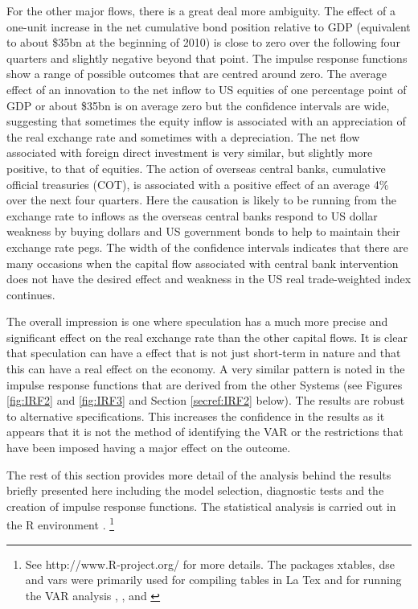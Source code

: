 \documentclass[12pt, a4paper, oneside]{article}\usepackage[]{graphicx}\usepackage[]{color}
\begin{document}
For the other major flows, there is a great deal more ambiguity.  The effect of a one-unit increase in the net cumulative bond position relative to GDP (equivalent to about \$35bn at the beginning of 2010) is close to zero over the following four quarters and slightly negative beyond that point.  The impulse response functions show a range of possible outcomes that are centred around zero.  The average effect of an innovation to the net inflow to US equities of one percentage point of GDP or about \$35bn is on average zero but the confidence intervals are wide, suggesting that sometimes the equity inflow is associated with an appreciation of the real exchange rate and sometimes with a depreciation.    The net flow associated with foreign direct investment is very similar, but slightly more positive,  to that of equities.  The action of overseas central banks, cumulative official treasuries (COT),  is associated with a positive effect of an average 4\% over the next four quarters.    Here the causation is likely to be running from the exchange rate to inflows as the overseas central banks respond to US dollar weakness by buying dollars and US government bonds to help to maintain their exchange rate pegs.  The width of the confidence intervals indicates that there are many occasions when the capital flow associated with central bank intervention does not have the desired effect and weakness in the US real trade-weighted index continues.   

The overall impression is one where speculation has a much more precise and significant effect on the real exchange rate than the other capital flows.  It is clear that speculation can have a effect that is not just short-term in nature and that this can have a real effect on the economy.  A very similar pattern is noted in the impulse response functions that are derived from the other Systems (see Figures \ref{fig:IRF2} and \ref{fig:IRF3} and Section \ref{secref:IRF2} below).  The results are robust to alternative specifications.  This increases the confidence in the results as it appears that it is not the method of identifying the VAR or the restrictions that have been imposed having a major effect on the outcome.  

The rest of this section provides more detail of the analysis behind the results briefly presented here including the model selection, diagnostic tests and the creation of impulse response functions.  The statistical analysis is carried out in the R environment \citep{R}. \footnote{See http://www.R-project.org/ for more details. The packages xtables, dse and vars were primarily used for compiling tables in La Tex and for running the VAR analysis \citep{R}, \citep{xtable}, \citep{varsa} and \citep{varsb}}  
\end{document}
